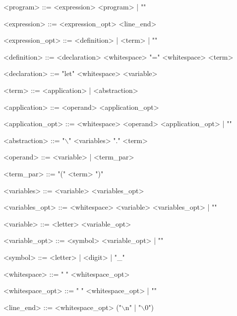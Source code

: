 \documentclass[12pt]{article}
\begin{document}
<program> ::= <expression> <program> | ""

<expression> ::= <expression\_opt> <line\_end>

<expression\_opt> ::= <definition> | <term> | ""

<definition> ::= <declaration> <whitespace> "=" <whitespace> <term>

<declaration> ::= "let" <whitespace> <variable>

<term> ::= <application> | <abstraction>

<application> ::= <operand> <application\_opt>

<application\_opt> ::= <whitespace> <operand> <application\_opt> | ""

<abstraction> ::= "$\backslash$" <variables> "." <term>

<operand> ::= <variable> | <term\_par>

<term\_par> ::= "(" <term> ")"

<variables> ::= <variable> <variables\_opt>

<variables\_opt> ::= <whitespace> <variable> <variables\_opt> | ""

<variable> ::= <letter> <variable\_opt>

<variable\_opt> ::= <symbol> <variable\_opt> | ""

<symbol> ::= <letter> | <digit> | "\_"

<whitespace> ::= " " <whitespace\_opt>

<whitespace\_opt> ::= " " <whitespace\_opt> | ""

<line\_end> ::= <whitespace\_opt> ("$\backslash$n" | "$\backslash$0")
\end{document}
